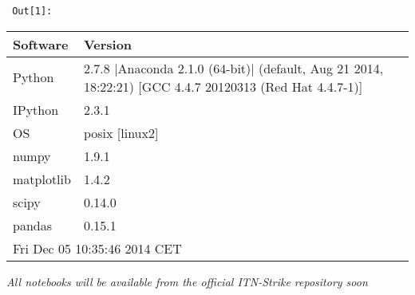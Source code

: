         {\par%
        \vspace{-1\smallerfontscale}%
        \noindent%
        \begin{minipage}{\cellleftmargin}%
    \hfill%
    {\smaller%
    \tt%
    \color{nbframe-out-prompt}%
    Out[1]:}%
    \hspace{\inputpadding}%
    \hspace{0em}%
    \hspace{3pt}%
    \end{minipage}%
        }%
    \begin{addmargin}[\cellleftmargin]{0em}%
    {\smaller%
    \vspace{-1\smallerfontscale}%
    
    
    \begin{tabular}{|l|l|}\hline
{\bf Software} & {\bf Version} \\ \hline\hline
Python & 2.7.8 |Anaconda 2.1.0 (64-bit)| (default, Aug 21 2014, 18:22:21) [GCC 4.4.7 20120313 (Red Hat 4.4.7-1)] \\ \hline
IPython & 2.3.1 \\ \hline
OS & posix [linux2] \\ \hline
numpy & 1.9.1 \\ \hline
matplotlib & 1.4.2 \\ \hline
scipy & 0.14.0 \\ \hline
pandas & 0.15.1 \\ \hline
\hline \multicolumn{2}{|l|}{Fri Dec 05 10:35:46 2014 CET} \\ \hline
\end{tabular}


    
}%
    \end{addmargin}%
    \emph{All notebooks will be available from the official ITN-Strike
repository soon}


